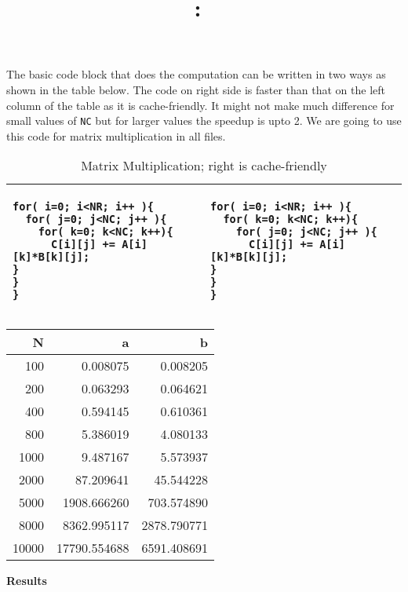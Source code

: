 \documentclass{article}
\title{
	\vspace{2in}
	\textmd{\textbf{\hmwkClass:\ \hmwkTitle}}\\
	\vspace{3in}
}
\author{\textbf{\hmwkAuthorName}}
\date{} %
\begin{document}


The basic code block that does the computation can be written in two ways
as shown in the table below. The code on right side is faster than that on
the left column of the table as it is cache-friendly. It might not make
much difference for small values of \verb+NC+ but for larger values 
the speedup is upto 2. We are going to use this code for matrix multiplication
in all files.
\begin{table}[h]

	\begin{center}
	\begin{tabular}{| l | l |}

			\hline 
			\begin{lstlisting}
for( i=0; i<NR; i++ ){
  for( j=0; j<NC; j++ ){
    for( k=0; k<NC; k++){
	  C[i][j] += A[i][k]*B[k][j];
}
}
}
			\end{lstlisting} 
			&
			\begin{lstlisting}
for( i=0; i<NR; i++ ){
  for( k=0; k<NC; k++){
    for( j=0; j<NC; j++ ){
	  C[i][j] += A[i][k]*B[k][j];
}
}
}
			\end{lstlisting} \\ 
			\hline

		\end{tabular}
	\end{center}
	\caption{Matrix Multiplication; right is cache-friendly}

\end{table}

\begin{table}[h]
	\begin{center}
	\begin{tabular}{| r | r | r |}
		\hline
		N & a & b \\ \hline
		100&0.008075 & 0.008205 \\ \hline
		200&0.063293&0.064621 \\ \hline
		400&0.594145&0.610361 \\ \hline
		800&5.386019&4.080133 \\ \hline
		1000&9.487167&5.573937 \\ \hline
		2000&87.209641&45.544228 \\ \hline
		5000&1908.666260&703.574890 \\ \hline
		8000&8362.995117&2878.790771 \\ \hline
		10000&17790.554688&6591.408691 \\ \hline
	\end{tabular}
\end{center}
\end{table}
\textbf{Results}
\end{document}
